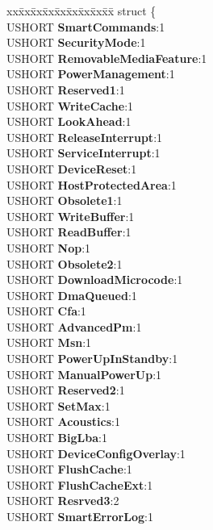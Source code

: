 \begin{DoxyCompactItemize}
\begin{tabbing}
xx\=xx\=xx\=xx\=xx\=xx\=xx\=xx\=xx\=\kill
struct \{\\
\>USHORT {\bfseries SmartCommands}:1\\
\>USHORT {\bfseries SecurityMode}:1\\
\>USHORT {\bfseries RemovableMediaFeature}:1\\
\>USHORT {\bfseries PowerManagement}:1\\
\>USHORT {\bfseries Reserved1}:1\\
\>USHORT {\bfseries WriteCache}:1\\
\>USHORT {\bfseries LookAhead}:1\\
\>USHORT {\bfseries ReleaseInterrupt}:1\\
\>USHORT {\bfseries ServiceInterrupt}:1\\
\>USHORT {\bfseries DeviceReset}:1\\
\>USHORT {\bfseries HostProtectedArea}:1\\
\>USHORT {\bfseries Obsolete1}:1\\
\>USHORT {\bfseries WriteBuffer}:1\\
\>USHORT {\bfseries ReadBuffer}:1\\
\>USHORT {\bfseries Nop}:1\\
\>USHORT {\bfseries Obsolete2}:1\\
\>USHORT {\bfseries DownloadMicrocode}:1\\
\>USHORT {\bfseries DmaQueued}:1\\
\>USHORT {\bfseries Cfa}:1\\
\>USHORT {\bfseries AdvancedPm}:1\\
\>USHORT {\bfseries Msn}:1\\
\>USHORT {\bfseries PowerUpInStandby}:1\\
\>USHORT {\bfseries ManualPowerUp}:1\\
\>USHORT {\bfseries Reserved2}:1\\
\>USHORT {\bfseries SetMax}:1\\
\>USHORT {\bfseries Acoustics}:1\\
\>USHORT {\bfseries BigLba}:1\\
\>USHORT {\bfseries DeviceConfigOverlay}:1\\
\>USHORT {\bfseries FlushCache}:1\\
\>USHORT {\bfseries FlushCacheExt}:1\\
\>USHORT {\bfseries Resrved3}:2\\
\>USHORT {\bfseries SmartErrorLog}:1\\

\end{tabbing}
\end{DoxyCompactItemize}
